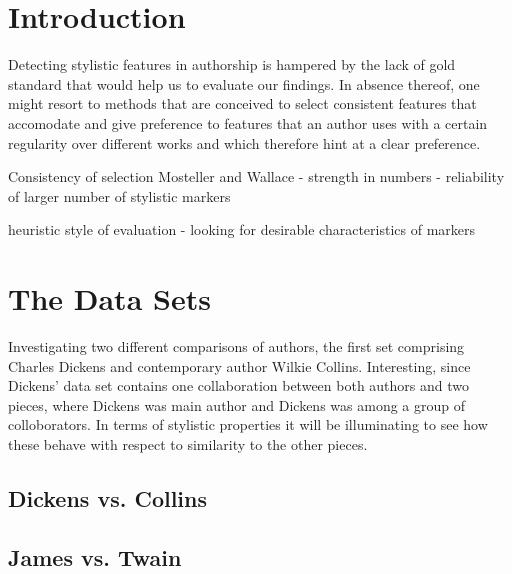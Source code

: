 \documentclass[a4paper,10pt,twoside,fleqn]{article}
\begin{document}
\section{Introduction}

Detecting stylistic features in authorship is hampered by the lack of gold
standard that would help us to evaluate our findings. 
In absence thereof, one might resort to methods that are conceived to select 
consistent features that accomodate and give preference to features that 
an author uses with a certain regularity over different works and which 
therefore hint at a clear preference. 

Consistency of selection
Mosteller and Wallace - strength in numbers - reliability of larger number 
of stylistic markers

heuristic style of evaluation - looking for desirable characteristics of markers



\section{The Data Sets}

Investigating two different comparisons of authors, the first set comprising Charles Dickens and 
contemporary author Wilkie Collins. 
Interesting, since Dickens' data set contains one collaboration between both authors and 
two pieces, where Dickens was main author and Dickens was among a group of colloborators. 
In terms of stylistic properties it will be illuminating to see how these behave 
with respect to similarity to the other pieces. 

\subsection{Dickens vs. Collins}




\subsection{James vs. Twain}
\end{document}

